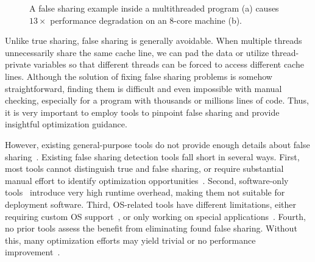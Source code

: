 \begin{figure}[htbp]
\centering
{}%
\hspace{20pt}
\caption{
A false sharing example inside a multithreaded program (a) causes $13\times$ performance degradation on an 8-core machine (b).
\label{fig:penalty}}
\end{figure}


Unlike true sharing, false sharing is generally avoidable. When multiple threads unnecessarily share the same cache line, we can pad the data or utilize thread-private variables so that different threads can be forced to access different cache lines. Although the solution of fixing false sharing problems is somehow straightforward, finding them is difficult and even impossible with manual checking, especially for a program with thousands or millions lines of code. Thus, it is very important to employ tools to pinpoint false sharing and provide insightful optimization guidance.

However, existing general-purpose tools do not provide enough details about false sharing~\cite{gprof, ibs-sc, Intel:VTune}. Existing false sharing detection tools fall short in several ways. First, most tools cannot distinguish true and false sharing, or require substantial manual effort to identify optimization opportunities~\cite{falseshare:binaryinstrumentation1,detect:ptu,detect:intel,falseshare:binaryinstrumentation2,DProf, qinzhao, OSdetection, mldetect, Wicaksono11detectingfalse, openmp}. Second, software-only tools~\cite{falseshare:binaryinstrumentation1,falseshare:binaryinstrumentation2,falseshare:simulator, Predator} introduce very high runtime overhead, making them not suitable for deployment software. Third, OS-related tools have different limitations, either requiring custom OS support~\cite{OSdetection}, or only working on special applications~\cite{Sheriff}. Fourth, no prior tools assess the benefit from eliminating found false sharing. Without this, many optimization efforts may yield trivial or no performance improvement~\cite{Sheriff, qinzhao}.

